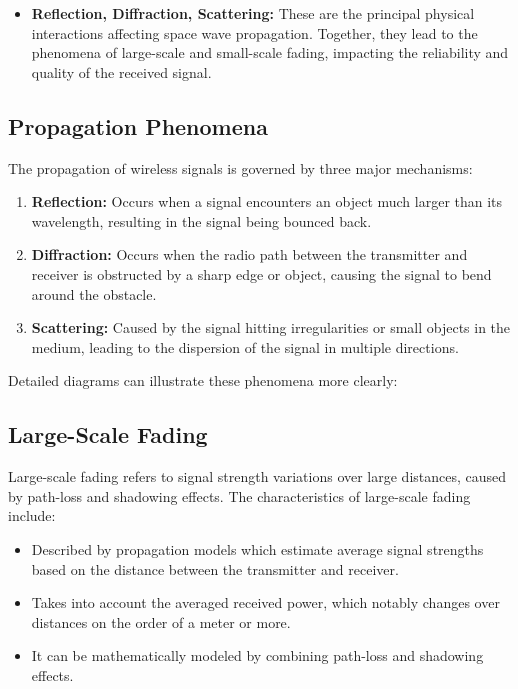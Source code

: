 \begin{itemize}
    \item \textbf{Reflection, Diffraction, Scattering:} These are the principal physical interactions affecting space wave propagation. Together, they lead to the phenomena of large-scale and small-scale fading, impacting the reliability and quality of the received signal.
\end{itemize}



\subsection*{Propagation Phenomena}

The propagation of wireless signals is governed by three major mechanisms:

\begin{enumerate}
    \item \textbf{Reflection:} Occurs when a signal encounters an object much larger than its wavelength, resulting in the signal being bounced back.
    \item \textbf{Diffraction:} Occurs when the radio path between the transmitter and receiver is obstructed by a sharp edge or object, causing the signal to bend around the obstacle.
    \item \textbf{Scattering:} Caused by the signal hitting irregularities or small objects in the medium, leading to the dispersion of the signal in multiple directions.
\end{enumerate}

Detailed diagrams can illustrate these phenomena more clearly:




\subsection*{Large-Scale Fading}

Large-scale fading refers to signal strength variations over large distances, caused by path-loss and shadowing effects. The characteristics of large-scale fading include:

\begin{itemize}
    \item Described by propagation models which estimate average signal strengths based on the distance between the transmitter and receiver.
    \item Takes into account the averaged received power, which notably changes over distances on the order of a meter or more.
    \item It can be mathematically modeled by combining path-loss and shadowing effects.
\end{itemize}


